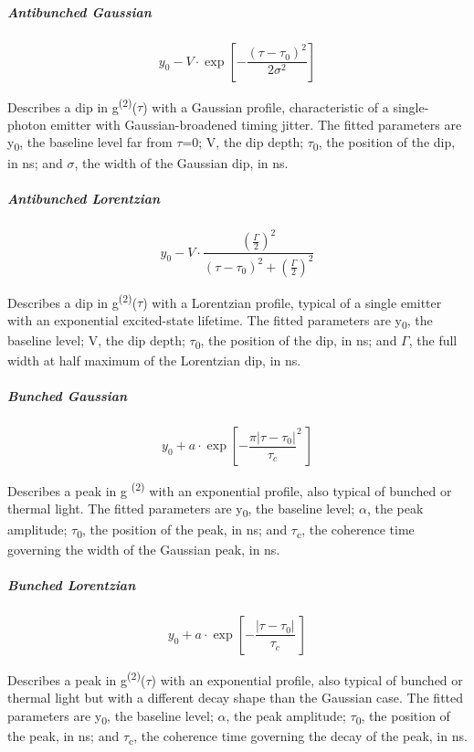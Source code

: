 \documentclass[
]{article}
\begin{document}
\hypertarget{antibunched-gaussian}{%
\subparagraph{Antibunched Gaussian}\label{antibunched-gaussian}}

\[y_{0} - V \cdot \exp\left\lbrack - \frac{\left( \tau - \tau_{0} \right)^{2}}{2\sigma^{2}} \right\rbrack\]

Describes a dip in g\textsuperscript{(2)}($\tau$) with a Gaussian profile,
characteristic of a single-photon emitter with Gaussian-broadened timing
jitter. The fitted parameters are y\textsubscript{0}, the baseline level
far from $\tau$=0; V, the dip depth; $\tau$\textsubscript{0}, the position of the
dip, in ns; and $\sigma$, the width of the Gaussian dip, in ns.

\hypertarget{antibunched-lorentzian}{%
\subparagraph{Antibunched Lorentzian}\label{antibunched-lorentzian}}

\[y_{0} - V \cdot \frac{\left( \frac{\Gamma}{2} \right)^{2}}{\left( \tau - \tau_{0} \right)^{2} + \left( \frac{\Gamma}{2} \right)^{2}}\]

Describes a dip in g\textsuperscript{(2)}($\tau$) with a Lorentzian profile,
typical of a single emitter with an exponential excited-state lifetime.
The fitted parameters are y\textsubscript{0}, the baseline level; V, the
dip depth; $\tau$\textsubscript{0}, the position of the dip, in ns; and
\(\Gamma\), the full width at half maximum of the Lorentzian dip, in ns.

\hypertarget{bunched-gaussian}{%
\subparagraph{Bunched Gaussian}\label{bunched-gaussian}}

\[y_{0} + a \cdot \exp\left\lbrack - \frac{\pi\left| \tau - \tau_{0} \right|}{\tau_{c}}^{2}\  \right\rbrack\]

Describes a peak in g \textsuperscript{(2)} with an exponential profile,
also typical of bunched or thermal light. The fitted parameters are
y\textsubscript{0}, the baseline level; $\alpha$, the peak amplitude;
$\tau$\textsubscript{0}, the position of the peak, in ns; and
$\tau$\textsubscript{c}, the coherence time governing the width of the
Gaussian peak, in ns.

\hypertarget{bunched-lorentzian}{%
\subparagraph{Bunched Lorentzian}\label{bunched-lorentzian}}

\[y_{0} + a \cdot \exp\left\lbrack - \frac{\left| \tau - \tau_{0} \right|}{\tau_{c}}\  \right\rbrack\]

Describes a peak in g\textsuperscript{(2)}($\tau$) with an exponential
profile, also typical of bunched or thermal light but with a different
decay shape than the Gaussian case. The fitted parameters are
y\textsubscript{0}, the baseline level; $\alpha$, the peak amplitude;
$\tau$\textsubscript{0}, the position of the peak, in ns; and
$\tau$\textsubscript{c}, the coherence time governing the decay of the peak,
in ns.
\end{document}
